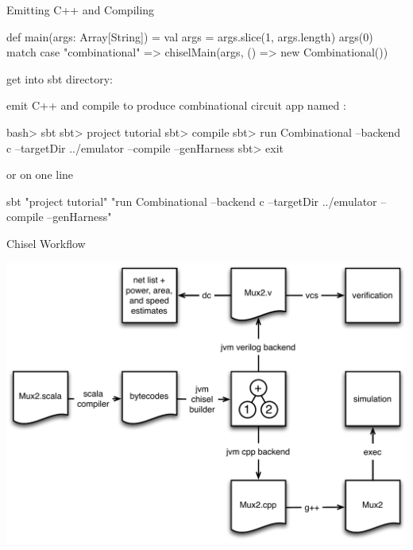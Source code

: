\documentclass[xcolor=pdflatex,dvipsnames,table]{beamer}
\begin{document}
\begin{frame}[fragile]{Emitting C++ and Compiling}

{
\begin{scala}
def main(args: Array[String]) = {
 val args = args.slice(1, args.length)
  args(0) match {
    case "combinational" => chiselMain(args, () => new Combinational())
} }
\end{scala}

get into sbt directory:


emit C++ and compile  to
produce combinational circuit app named :

\begin{scala}
bash> sbt
sbt> project tutorial
sbt> compile
sbt> run Combinational --backend c --targetDir ../emulator --compile --genHarness
sbt> exit
\end{scala}

or on one line

\begin{scala}
sbt "project tutorial" "run Combinational --backend c --targetDir ../emulator --compile --genHarness"
\end{scala}
}
\end{frame}

\begin{frame}{Chisel Workflow}
\begin{center}
\includegraphics[height=0.9\textheight]{figs/chisel-workflow.pdf}
\end{center}
\end{frame}
\end{document}
